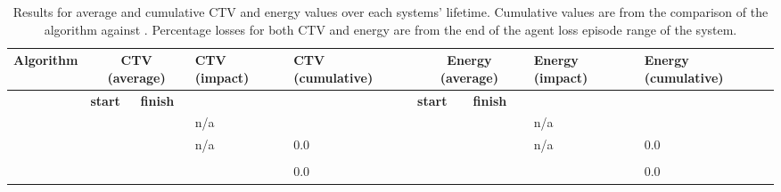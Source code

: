 \begin{table}[ht]
	\centering
\begin{tabular}{
			|p{}|p{0.05\textwidth}|p{}|p{}|p{}|p{0.06\textwidth}|p{}|p{0.10\textwidth}|p{}|
		}
\hline
\textbf{Algorithm}
	& \multicolumn{2}{c|}{\textbf{CTV \newline (average)}}
	& \textbf{CTV \newline(impact)}
	& \textbf{CTV \newline(cumulative)}
	& \multicolumn{2}{c|}{\textbf{Energy \newline (average)}}
	& \textbf{Energy \newline (impact)}
	& \textbf{Energy  \newline(cumulative)} \\
\hline & \textbf{start} & \textbf{finish }& & & \textbf{start} & \textbf{finish} & &  \\
\hline
		\algorithmBalancedSimple{}{}
			& \resultsSimpleCTVBalancedStart{}{} &  \resultsSimpleCTVBalancedEnd{}{} 
			& n/a
			& \resultsSimpleCumulativeCTVComparison{}{}
			& \resultsSimpleEnergyBalancedStart{}{} &  \resultsSimpleEnergyBalancedEnd{}{}
			& n/a
			& \resultsSimpleCumulativeEnergyComparison{}{} \\
		\algorithmBaselineSimple{}{} 
			& \resultsSimpleCTVQRoutingStart{}{} &  \resultsSimpleCTVQRoutingEnd{}{} 
			& n/a
			& $0.0$
			& \resultsSimpleEnergyQRoutingStart{}{} &  \resultsSimpleEnergyQRoutingEnd{}{}
			& n/a
			& $0.0$ \\
			
		\algorithmFailure{}{} 
		& \resultsNodeFailureCTVBalancedStart{}{}  &  \resultsNodeFailureCTVBalancedEnd{}{} 
		& \resultsNodeFailureCTVBalancedImpactDiff{}{}
		& \resultsNodeFailureCumulativeCTVComparison{}{}
		& \resultsNodeFailureEnergyBalancedStart{}{} &  \resultsNodeFailureEnergyBalancedEnd{}{}
		& \resultsNodeFailureEnergyBalancedImpactDiff{}{} 
		& \resultsNodeFailureCumulativeEnergyComparison{}{} \\
		\algorithmBaselineFailure{}{} 
		& \resultsNodeFailureCTVQRoutingStart{}{} &  \resultsNodeFailureCTVQRoutingEnd{}{} 
		& \resultsNodeFailureCTVQRoutingImpactDiff{}{}
		& $0.0$
		& \resultsNodeFailureEnergyQRoutingEnd{}{}  &   \resultsNodeFailureEnergyQRoutingEnd{}{}
		& \resultsNodeFailureEnergyQRoutingImpactDiff{}{}
		& $0.0$ \\
\hline
\end{tabular}
\captionsetup{labelfont=bf,singlelinecheck=on,justification=raggedright}
\caption{Results for average and cumulative CTV and energy values over each systems' lifetime. Cumulative values are from the comparison of the \acronymWSNOptimisation{}{} algorithm against \acronymBaseline{}{}. Percentage losses for both CTV and energy are from the end of the agent loss episode range of the \simulationNodeFailure{}{} system.}
\label{table:results_main}
\end{table}

